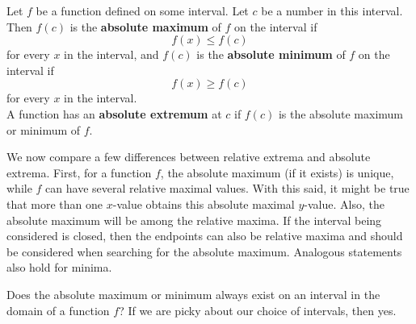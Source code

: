 \documentclass{book}
\begin{document}


\begin{Def} Let $f$ be a function defined on some interval. Let $c$ be a number in this interval. Then $f(c)$ is the \textbf{absolute maximum} of $f$ on the interval if \[f(x) \le f(c)\] for every $x$ in the interval, and $f(c)$ is the \textbf{absolute minimum} of $f$ on the interval if \[f(x) \ge f(c)\] for every $x$ in the interval.\\

A function has an \textbf{absolute extremum} at $c$ if $f(c)$ is the absolute maximum or minimum of $f$.
\end{Def}\vs

We now compare a few differences between relative extrema and absolute extrema. First, for a function $f$, the absolute maximum (if it exists) is unique, while $f$ can have several relative maximal values. With this said, it might be true that more than one $x$-value obtains this absolute maximal $y$-value. Also, the absolute maximum will be among the relative maxima. If the interval being considered is closed, then the endpoints can also be relative maxima and should be considered when searching for the absolute maximum. Analogous statements also hold for minima. 

Does the absolute maximum or minimum always exist on an interval in the domain of a function $f$? If we are picky about our choice of intervals, then yes.
\end{document}
